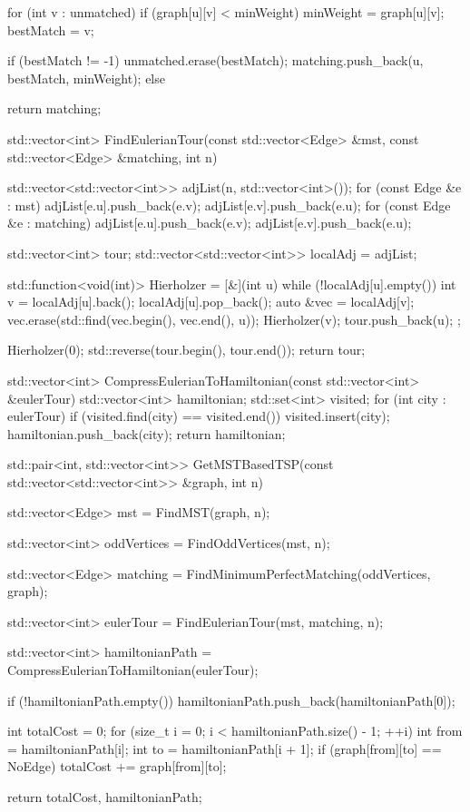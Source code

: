 \begin{cppcode}
{{        for (int v : unmatched) {
            if (graph[u][v] < minWeight) {
                minWeight = graph[u][v];
                bestMatch = v;
            }
        }

        if (bestMatch != -1) {
            unmatched.erase(bestMatch);
            matching.push_back({u, bestMatch, minWeight});
        } else {
        }
    }

    return matching;
}

std::vector<int> FindEulerianTour(const std::vector<Edge> &mst,
                                  const std::vector<Edge> &matching, int n) {
    std::vector<std::vector<int>> adjList(n, std::vector<int>());
    for (const Edge &e : mst) {
        adjList[e.u].push_back(e.v);
        adjList[e.v].push_back(e.u);
    }
    for (const Edge &e : matching) {
        adjList[e.u].push_back(e.v);
        adjList[e.v].push_back(e.u);
    }

    std::vector<int> tour;
    std::vector<std::vector<int>> localAdj = adjList;

    std::function<void(int)> Hierholzer = [&](int u) {
        while (!localAdj[u].empty()) {
            int v = localAdj[u].back();
            localAdj[u].pop_back();
            auto &vec = localAdj[v];
            vec.erase(std::find(vec.begin(), vec.end(), u));
            Hierholzer(v);
        }
        tour.push_back(u);
    };

    Hierholzer(0);
    std::reverse(tour.begin(), tour.end());
    return tour;
}

std::vector<int> CompressEulerianToHamiltonian(const std::vector<int> &eulerTour) {
    std::vector<int> hamiltonian;
    std::set<int> visited;
    for (int city : eulerTour) {
        if (visited.find(city) == visited.end()) {
            visited.insert(city);
            hamiltonian.push_back(city);
        }
    }
    return hamiltonian;
}

std::pair<int, std::vector<int>> GetMSTBasedTSP(const std::vector<std::vector<int>> &graph, int n) {
    std::vector<Edge> mst = FindMST(graph, n);

    std::vector<int> oddVertices = FindOddVertices(mst, n);

    std::vector<Edge> matching = FindMinimumPerfectMatching(oddVertices, graph);

    std::vector<int> eulerTour = FindEulerianTour(mst, matching, n);

    std::vector<int> hamiltonianPath = CompressEulerianToHamiltonian(eulerTour);

    if (!hamiltonianPath.empty()) {
        hamiltonianPath.push_back(hamiltonianPath[0]);
    }

    int totalCost = 0;
    for (size_t i = 0; i < hamiltonianPath.size() - 1; ++i) {
        int from = hamiltonianPath[i];
        int to = hamiltonianPath[i + 1];
        if (graph[from][to] == NoEdge) {
        }
        totalCost += graph[from][to];
    }

    return {totalCost, hamiltonianPath};
}
\end{cppcode}

